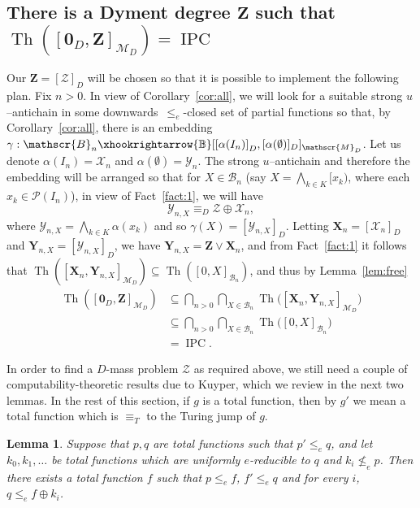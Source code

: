 \documentclass[11pt]{amsart}
\newtheorem{lemma}[theorem]{Lemma}
\newcommand{\Th}{\operatorname{Th}}
\newcommand{\IPC}{\operatorname{IPC}}
\newcommand{\Dym}{\mathscr{M}_{D}}
\newcommand{\MP}[1]{\ensuremath{\mathcal{#1}}}
\begin{document}
\subsection{There is a Dyment degree $\mathbf{Z}$ such that 
$\Th([\mathbf{0}_D, \mathbf{Z}]_{\Dym})=\IPC$} 

Our $\mathbf{Z}=[\MP{Z}]_D$ will be chosen so that it is possible to implement the
following plan.  Fix $n > 0$.  In view of Corollary~\ref{cor:all}, we will look for a suitable strong 
$u$--antichain in some downwards~$\leq_e$-closed set of 
partial functions so that, by Corollary~\ref{cor:all}, there is an embedding 
$\gamma: \mathscr{B}_n  \xhookrightarrow{\mathbb{B}} [[\alpha(I_n)]_D, 
[\alpha(\emptyset)]_D]_{\Dym}$. Let us denote $\alpha(I_n)=\mathcal{X}_n$ 
and $\alpha(\emptyset)=\mathcal{Y}_n$. The strong $u$--antichain and therefore the
embedding will be arranged so that for $X \in \mathscr{B}_n$ 
(say $X=\bigwedge_{k \in K} [x_k)$, where each $x_k \in \mathscr{P}(I_n)$), 
in view of Fact~\ref{fact:1}, we will have
\[
\mathcal{Y}_{n,X}{\equiv_D}  \mathcal{Z} \oplus  \mathcal{X}_{n},
\]
where $\mathcal{Y}_{n,X}= \bigwedge_{k \in K} \alpha(x_k)$ and so
$\gamma(X)=[\mathcal{Y}_{n,X}]_D$. Letting $\mathbf{X}_n=[\mathcal{X}_n]_D$ 
and $\mathbf{Y}_{n,X}=[\mathcal{Y}_{n,X}]_D$, we 
have $\mathbf{Y}_{n,X}= \mathbf{Z} \lor \mathbf{X}_n$, and from 
Fact~\ref{fact:1} it follows that $\Th([\mathbf{X}_{n}, 
\mathbf{Y}_{n,X}]_{\Dym}) \subseteq \Th([0,X]_{\mathscr{B}_n})$, and thus by 
Lemma~\ref{lem:free}
\begin{align*}
  \Th([\mathbf{0}_D, \mathbf{Z}]_{\Dym}) & \subseteq \bigcap_{n>0} \bigcap_{X \in \mathscr{B}_n}
\Th\big([\mathbf{X}_{n}, \mathbf{Y}_{n,X}]_{\Dym}\big) \\
   & \subseteq
\bigcap_{n>0} \bigcap_{X \in \mathscr{B}_n}
      \Th\big([0,X]_{\mathscr{B}_n}\big)\\
      &= \IPC.
\end{align*}

In order to find a $D$-mass problem $\mathcal{Z}$ as required above, we 
still need a couple of computability-theoretic results due to Kuyper, which 
we review in the next two lemmas. In the rest of this section, if $g$ is a 
total function, then by $g'$ we mean a total function which is $\equiv_T$ to 
the Turing jump of $g$. 

\begin{lemma}\label{lem:main21}\cite[Theorem~4.10]{Kuyper-Medvedev}
Suppose that $p,q$ are total functions such that $p' \le_e q$, and let $k_0, 
k_1, \ldots$ be total functions which are uniformly $e$-reducible to $q$ and 
$k_i \nleq_e p$. Then there exists a total function $f$ such that $p\le_e f$, 
$f' \le_e q$ and for every $i$, $q \le_e f \oplus k_i$. 
\end{lemma}
\end{document}
